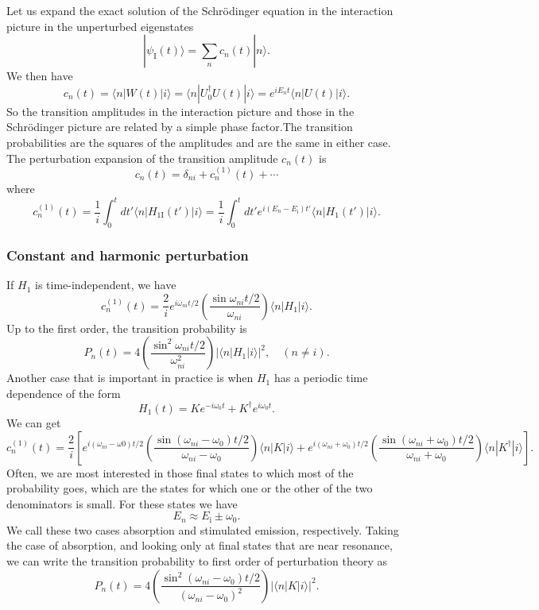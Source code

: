 Let us expand the exact solution of the Schr\"{o}dinger equation in the interaction picture in the unperturbed eigenstates
\[|\psi_{\mathrm{I}}(t)\rangle = \sum_n c_n(t) |n\rangle.\]
We then have
\[c_n(t) = \langle n | W(t) | i\rangle = \langle n | U^{\dagger}_0U(t) | i\rangle = e^{iE_nt} \langle n | U(t) | i\rangle .\]
So the transition amplitudes in the interaction picture and those in the Schr\"{o}dinger picture are related by a simple phase factor.The transition probabilities are the squares of the amplitudes and are the same in either case. The perturbation expansion of the transition amplitude $c_n(t)$ is
\[c_n(t) = \delta_{ni} + c^{(1)}_n(t) + \cdots\]
where
\[c^{(1)}_n(t) = \frac{1}{i} \int_0^t dt' \langle n | H_{1\mathrm{I}}(t')|i\rangle = \frac{1}{i} \int_0^t dt' e^{i(E_n-E_{\mathrm{i}})t'} \langle n | H_{1}(t')|i\rangle.\]

\subsubsection{Constant and harmonic perturbation}
If $H_1$ is time-independent, we have
\[c^{(1)}_n(t) = \frac{2}{i} e^{i\omega_{ni}t/2} \left( \frac{\sin\omega_{ni}t/2}{\omega_{ni}} \right) \langle n | H_1 | i \rangle.\]
Up to the first order, the transition probability is
\[P_n(t) = 4 \left( \frac{\sin^2\omega_{ni}t/2}{\omega_{ni}^2} \right) |\langle n | H_1 | i \rangle|^2 , \quad (n \neq i).\]
Another case that is important in practice is when $H_1$ has a periodic time dependence of the form
\[H_1(t) = Ke^{-i\omega_0t} + K^{\dagger}e^{i\omega_0t}.\]
We can get
\[c^{(1)}_n(t) = \frac{2}{i} \left[ e^{i(\omega_{ni}-\omega0)t/2} \left( \frac{\sin(\omega_{ni}-\omega_0)t/2}{\omega_{ni}-\omega_0} \right) \langle n | K | i \rangle  + e^{i(\omega_{ni}+\omega_0)t/2} \left( \frac{\sin(\omega_{ni}+\omega_0)t/2}{\omega_{ni}+\omega_0} \right) \langle n | K^{\dagger} | i \rangle \right]  .\]
Often, we are most interested in those final states to which most of the probability goes, which are the states for which one or the other of the two denominators is small.
For these states we have
\[E_n \approx E_{\mathrm{i}} \pm \omega_0.\]
We call these two cases absorption and stimulated emission, respectively. 
Taking the case of absorption, and looking only at final states that are near resonance, we can write the transition probability to first order of perturbation theory as
\[P_n(t) = 4 \left( \frac{\sin^2(\omega_{ni}-\omega_0)t/2}{(\omega_{ni}-\omega_0)^2} \right) |\langle n | K | i \rangle|^2.\]

